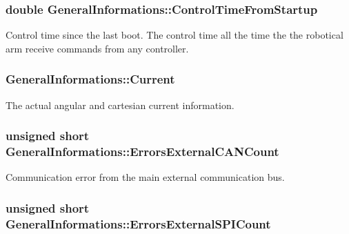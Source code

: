 \subsubsection[{\texorpdfstring{Control\+Time\+From\+Startup}{ControlTimeFromStartup}}]{\setlength{\rightskip}{0pt plus 5cm}double General\+Informations\+::\+Control\+Time\+From\+Startup}\hypertarget{struct_general_informations_aa38f3afead9da07799c45bca401037eb}{}\label{struct_general_informations_aa38f3afead9da07799c45bca401037eb}


Control time since the last boot. The control time all the time the the robotical arm receive commands from any controller. 

\subsubsection[{\texorpdfstring{Current}{Current}}]{ General\+Informations\+::\+Current}\hypertarget{struct_general_informations_adecf04bc979eae4013a1dc4c5d2e43db}{}\label{struct_general_informations_adecf04bc979eae4013a1dc4c5d2e43db}


The actual angular and cartesian current information. 

\subsubsection[{\texorpdfstring{Errors\+External\+C\+A\+N\+Count}{ErrorsExternalCANCount}}]{\setlength{\rightskip}{0pt plus 5cm}unsigned short General\+Informations\+::\+Errors\+External\+C\+A\+N\+Count}\hypertarget{struct_general_informations_ac7ac1443cdd9f470fda64cd077ce06fb}{}\label{struct_general_informations_ac7ac1443cdd9f470fda64cd077ce06fb}


Communication error from the main external communication bus. 

\subsubsection[{\texorpdfstring{Errors\+External\+S\+P\+I\+Count}{ErrorsExternalSPICount}}]{\setlength{\rightskip}{0pt plus 5cm}unsigned short General\+Informations\+::\+Errors\+External\+S\+P\+I\+Count}\hypertarget{struct_general_informations_a53e3e2b371092bf2f0fbc922d7dff8f3}{}\label{struct_general_informations_a53e3e2b371092bf2f0fbc922d7dff8f3}


